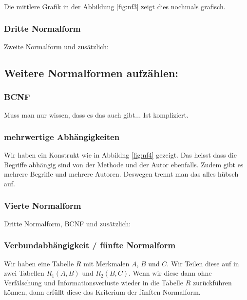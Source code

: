 Die mittlere Grafik in der Abbildung \ref{fig:nf3} zeigt dies nochmals grafisch.

\subsubsection{Dritte Normalform}
Zweite Normalform und zusätzlich:
\begin{center}
\end{center}

\subsection{Weitere Normalformen aufzählen:}

\subsubsection{BCNF}
Muss man nur wissen, dass es das auch gibt... Ist kompliziert.

\subsubsection{mehrwertige Abhängigkeiten}

Wir haben ein Konstrukt wie in Abbildng \ref{fig:nf4} gezeigt. Das heisst dass die Begriffe abhängig sind von der Methode und der Autor ebenfalls. Zudem gibt es mehrere Begriffe und mehrere Autoren. Deswegen trennt man das alles hübsch auf.
\subsubsection{Vierte Normalform}
Dritte Normalform, BCNF und zusätzlich:
\begin{center}
\end{center}

\subsubsection{Verbundabhängigkeit / fünfte Normalform}
Wir haben eine Tabelle \(R\) mit Merkmalen \(A\), \(B\) und \(C\). Wir Teilen diese auf in zwei Tabellen \(R_{1}(A,B)\) und \(R_{2}(B,C)\). Wenn wir diese dann ohne Verfälschung und Informationsverluste wieder in die Tabelle \(R\) zurückführen können, dann erfüllt diese das Kriterium der fünften Normalform.